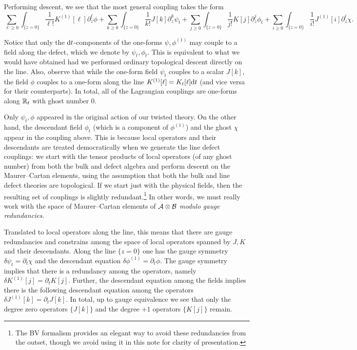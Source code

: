 \documentclass[11pt]{amsart}
\begin{document}
Performing descent, we see that the most general coupling takes the form
\[
\sum_{\ell \geq 0} \int_{\{z=0\}} \frac{1}{\ell!} K^{(1)} [\ell] \partial_z^\ell \phi + \sum_{k \geq 0} \int_{\{z=0\}} \frac{1}{k!} J[k] \partial_z^k \psi_t  + \sum_{j \geq 0} \int_{\{z=0\}} \frac{1}{j!} K[j] \partial_z^j \phi_t +  \sum_{i \geq 0} \int_{\{z=0\}} \frac{1}{i!} J^{(1)}[i] \partial_z^i \chi.
\] 

Notice that only the ${\rm d} t$-components of the one-forms $\psi, \phi^{(1)}$ may couple to a field along the defect, which we denote by $\psi_t, \phi_t$. This is equivalent to what we would have obtained had we performed ordinary topological descent directly on the line.
Also, observe that while the one-form field $\psi_t$ couples to a scalar $J[k]$, the field $\phi$ couples to a one-form along the line $K^{(1)}[\ell] = K_t [\ell] {\rm d} t$ (and vice versa for their counterparts). 
In total, all of the Lagrangian couplings are one-forms along $\mathbb R_t$ with ghost number 0.

Only $\psi_t, \phi$ appeared in the original action of our twisted theory. 
On the other hand, the descendant field $\phi_t$ (which is a component of $\phi^{(1)}$) and the ghost $\chi$ appear in the coupling above. 
This is because local operators and their descendants are treated democratically when we generate the line defect couplings: we start with the tensor products of local operators (of any ghost number) from both the bulk and defect algebra and perform descent on the Maurer--Cartan elements, using the assumption that both the bulk and line defect theories are topological. 
If we start just with the physical fields, then the resulting set of couplings is slightly redundant.\footnote{The BV formalism provides an elegant way to avoid these redundancies from the outset, though we avoid using it in this note for clarity of presentation.} 
In other words, we must really work with the space of Maurer--Cartan elements of $\mathcal A \otimes \mathcal B$ \textit{modulo gauge redundancies}.

Translated to local operators along the line, this means that there are gauge redundancies and constrains among the space of local operators spanned by $J,K$ and their descendants.
Along the line $\{z=0\}$ one has the gauge symmetry $\delta \psi_t = \partial_t \chi$ and the descendant equation $\delta \phi^{(1)} = \partial_t \phi$. 
The gauge symmetry implies that there is a redundancy among the operators, namely $\delta K^{(1)}[j] = \partial_t K[j]$. 
Further, the descendant equation among the fields implies there is the following descendant equation among the operators $\delta J^{(1)} [k] = \partial_t J[k]$. 
In total, up to gauge equivalence we see that only the degree zero operators $\{J[k]\}$ and the degree $+1$ operators $\{K[j]\}$ remain.
 
\end{document}
